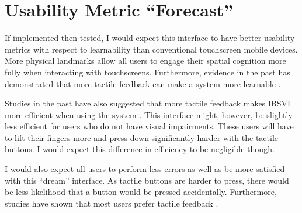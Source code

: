 \documentclass[11pt]{article}
\begin{document}
\section{Usability Metric ``Forecast''}
If implemented then tested, I would expect this interface to have better usability metrics with respect to learnability than conventional touchscreen mobile devices.  More physical landmarks allow all users to engage their spatial cognition more fully when interacting with touchscreens. Furthermore, evidence in the past has demonstrated  that more tactile feedback can make a system more learnable \cite{El-Glaly:2013:TTF:2460625.2460665, conf/chi/KaneWL11}. 

Studies in the past have also suggested that more tactile feedback makes IBSVI more efficient when using the system \cite{El-Glaly:2013:TTF:2460625.2460665, Buxton:1986:HID:22339.22386}. This interface might, however, be slightly less efficient for users who do not have visual impairments. These users will have to lift their fingers more and press down significantly harder with the tactile buttons. I would expect this difference in efficiency to be negligible though.

I would also expect all users to perform less errors as well as be more satisfied with this ``dream'' interface. As tactile buttons are harder to press, there would be less likelihood that a button would be pressed accidentally. Furthermore, studies have shown that most users prefer tactile feedback \cite{Freeman:2014:TFA:2663204.2663280}.

\clearpage


{}

\end{document}
